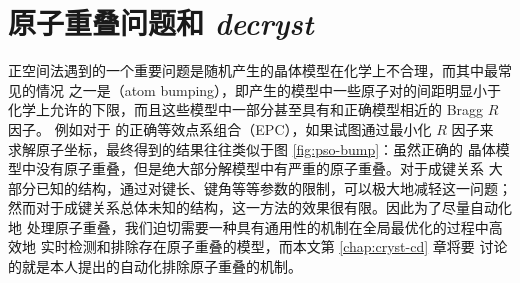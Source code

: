 \section{原子重叠问题和 \emph{decryst}}\label{sec:atom-bump}

正空间法遇到的一个重要问题是随机产生的晶体模型在化学上不合理，而其中最常见的情况
之一是（atom bumping），即产生的模型中一些原子对的间距明显小于
化学上允许的下限，而且这些模型中一部分甚至具有和正确模型相近的 Bragg $R$ 因子。
例如对于  的正确等效点系组合（EPC），如果试图通过最小化 $R$ 因子来
求解原子坐标，最终得到的结果往往类似于图 \ref{fig:pso-bump}：虽然正确的
晶体模型中没有原子重叠，但是绝大部分解模型中有严重的原子重叠。对于成键关系
大部分已知的结构，通过对键长、键角等等参数的限制，可以极大地减轻这一问题；
然而对于成键关系总体未知的结构，这一方法的效果很有限。因此为了尽量自动化地
处理原子重叠，我们迫切需要一种具有通用性的机制在全局最优化的过程中高效地
实时检测和排除存在原子重叠的模型，而本文第 \ref{chap:cryst-cd} 章将要
讨论的就是本人\parencite{liu2017}提出的自动化排除原子重叠的机制。

\begin{figure}[htbp!]\bfcmd
{}
\end{figure}

